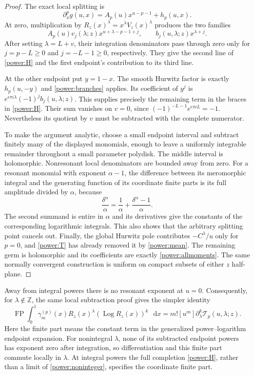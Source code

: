 \documentclass[11pt,a4paper]{article}
\numberwithin{equation}{section}
\theoremstyle{definition}
\theoremstyle{remark}
\DeclareMathOperator{\Log}{Log}
\DeclareMathOperator{\FP}{FP}
\newcommand{\dd}{\mathop{}\!\mathrm{d}}
\begin{document}
\begin{proof}
The exact local splitting is
\[
 \partial_x^p g(u,x)=A_p(u)x^{u-p-1}+h_p(u,x).
\]
At zero, multiplication by $R_z(x)^\lambda=x^\lambda V_z(x)^\lambda$
produces the two families
\[
 A_p(u)v_j(\lambda;z)x^{u+\lambda-p-1+j},\qquad
 b_j(u,\lambda;z)x^{\lambda+j}.
\]
After setting $\lambda=L+v$, their integration denominators pass
through zero only for $j=p-L\ge0$ and $j=-L-1\ge0$, respectively.
They give the second line of \eqref{power:H} and the first endpoint's
contribution to its third line.

At the other endpoint put $y=1-x$.  The smooth Hurwitz factor is
exactly $h_p(u,-y)$ and \eqref{power:branches} applies.  Its
coefficient of $y^j$ is
$e^{\epsilon\pi i\lambda}(-1)^jb_j(u,\lambda;z)$.
This supplies precisely the remaining term in the braces in
\eqref{power:H}.  Their sum vanishes on $v=0$, since
$(-1)^{-L-1}e^{\epsilon\pi iL}=-1$.  Nevertheless its quotient by
$v$ must be subtracted with the complete numerator.

To make the argument analytic, choose a small endpoint interval and
subtract finitely many of the displayed monomials, enough to leave
a uniformly integrable remainder throughout a small parameter
polydisk.  The middle interval is holomorphic.  Nonresonant local
denominators are bounded away from zero.  For a resonant monomial
with exponent $\alpha-1$, the difference between its meromorphic
integral and the generating function of its coordinate finite parts
is its full amplitude divided by $\alpha$, because
\[
 \frac{\delta^\alpha}{\alpha}
 =\frac1\alpha+\frac{\delta^\alpha-1}{\alpha}.
\]
The second summand is entire in $\alpha$ and its derivatives give
the constants of the corresponding logarithmic integrals.  This
also shows that the arbitrary splitting point cancels out.  Finally,
the global Hurwitz pole contributes $-C^\lambda/u$ only for $p=0$,
and \eqref{power:T} has already removed it by \eqref{power:mean}.
The remaining germ is holomorphic and its coefficients are exactly
\eqref{power:allmoments}.  The same normally convergent construction
is uniform on compact subsets of either $z$ half-plane.
\end{proof}

Away from integral powers there is no resonant exponent at $u=0$.
Consequently, for $\lambda\notin\mathbb Z$, the same local subtraction
proof gives the simpler identity
\begin{equation}\label{power:noninteger}
 \FP\int_0^1\gamma_m^{(p)}(x)R_z(x)^\lambda
             (\Log R_z(x))^k\,\dd x
 =m![u^m]\partial_\lambda^k\mathcal T_p(u,\lambda;z).
\end{equation}
Here the finite part means the constant term in the generalized
power--logarithm endpoint expansion.  For nonintegral $\lambda$,
none of its subtracted endpoint powers has exponent zero after
integration, so differentiation and this finite part commute locally
in $\lambda$.  At integral powers the full completion
\eqref{power:H}, rather than a limit of \eqref{power:noninteger},
specifies the coordinate finite part.
\end{document}

